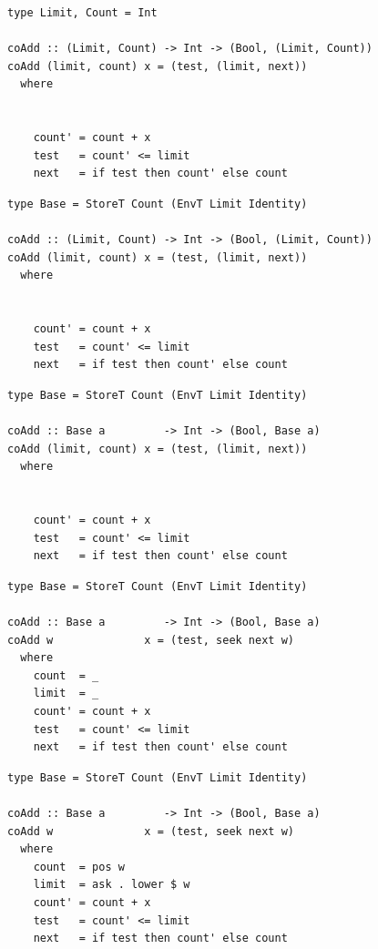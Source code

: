 \documentclass{beamer}
\begin{document}
\begin{frame}[fragile]
  \begin{overprint}
    \begin{verbatim}
type Limit, Count = Int

coAdd :: (Limit, Count) -> Int -> (Bool, (Limit, Count))
coAdd (limit, count) x = (test, (limit, next))
  where


    count' = count + x
    test   = count' <= limit
    next   = if test then count' else count
    \end{verbatim}
    \begin{verbatim}
type Base = StoreT Count (EnvT Limit Identity)

coAdd :: (Limit, Count) -> Int -> (Bool, (Limit, Count))
coAdd (limit, count) x = (test, (limit, next))
  where


    count' = count + x
    test   = count' <= limit
    next   = if test then count' else count
    \end{verbatim}
    \begin{verbatim}
type Base = StoreT Count (EnvT Limit Identity)

coAdd :: Base a         -> Int -> (Bool, Base a)
coAdd (limit, count) x = (test, (limit, next))
  where


    count' = count + x
    test   = count' <= limit
    next   = if test then count' else count
    \end{verbatim}
    \begin{verbatim}
type Base = StoreT Count (EnvT Limit Identity)

coAdd :: Base a         -> Int -> (Bool, Base a)
coAdd w              x = (test, seek next w)
  where
    count  = _
    limit  = _
    count' = count + x
    test   = count' <= limit
    next   = if test then count' else count
  \end{verbatim}
  \begin{verbatim}
type Base = StoreT Count (EnvT Limit Identity)

coAdd :: Base a         -> Int -> (Bool, Base a)
coAdd w              x = (test, seek next w)
  where
    count  = pos w
    limit  = ask . lower $ w
    count' = count + x
    test   = count' <= limit
    next   = if test then count' else count
  \end{verbatim}
  \end{overprint}
\end{frame}
\end{document}
